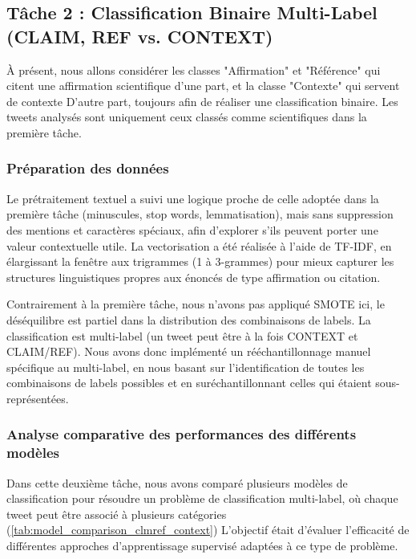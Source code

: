 \subsection{Tâche 2 : Classification Binaire Multi-Label ({CLAIM, REF} vs. {CONTEXT})}\label{subsec:modele-2:-claim-et-ref-vs-contexte}
À présent, nous allons considérer les classes "Affirmation" et "Référence" qui citent une affirmation scientifique d’une part, et la classe "Contexte" qui servent de contexte
D’autre part, toujours afin de réaliser une classification binaire.
Les tweets analysés sont uniquement ceux classés comme scientifiques dans la première tâche.

\subsubsection{Préparation des données}
Le prétraitement textuel a suivi une logique proche de celle adoptée dans la première tâche (minuscules, stop words, lemmatisation), mais sans suppression des mentions et caractères spéciaux, afin d’explorer s’ils peuvent porter une valeur contextuelle utile.
La vectorisation a été réalisée à l’aide de TF-IDF, en élargissant la fenêtre aux trigrammes (1 à 3-grammes) pour mieux capturer les structures linguistiques propres aux énoncés de type affirmation ou citation.

Contrairement à la première tâche, nous n’avons pas appliqué SMOTE ici, le déséquilibre est partiel dans la distribution des combinaisons de labels.
La classification est multi-label (un tweet peut être à la fois CONTEXT et CLAIM/REF).
Nous avons donc implémenté un rééchantillonnage manuel spécifique au multi-label, en nous basant sur l’identification de toutes les combinaisons de labels possibles et en suréchantillonnant celles qui étaient sous-représentées.

\subsubsection{Analyse comparative des performances des différents modèles}
Dans cette deuxième tâche, nous avons comparé plusieurs modèles de classification pour résoudre un problème de classification multi-label, où chaque tweet peut être associé à plusieurs catégories (\autoref{tab:model_comparison_clmref_context})
L’objectif était d’évaluer l’efficacité de différentes approches d’apprentissage supervisé adaptées à ce type de problème.

